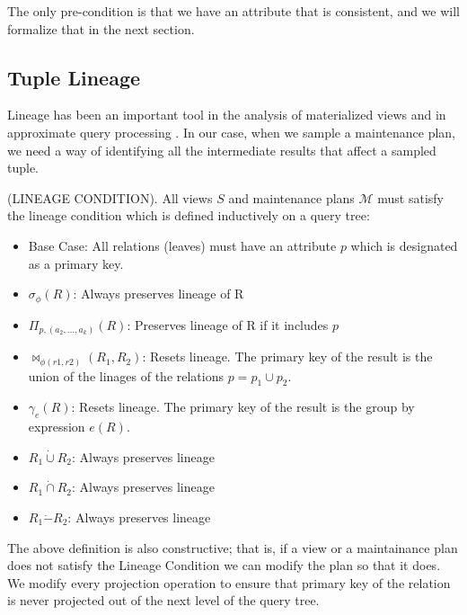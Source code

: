 The only pre-condition is that we have an attribute that is consistent, and we will formalize that in the next section.

\subsection{Tuple Lineage}
Lineage has been an important tool in the analysis of materialized views \cite{DBLP:journals/vldb/CuiW03} and in approximate query processing \cite{DBLP:conf/sigmod/ZengGMZ14}.
In our case, when we sample a maintenance plan, we need a way of identifying all the intermediate results that affect a sampled tuple.

\begin{definition}
(LINEAGE CONDITION). All views $S$ and maintenance plans $\mathcal{M}$ must satisfy the lineage condition which is defined inductively on a query tree:
\begin{itemize}\vspace{-.45em}
\item Base Case: All relations (leaves) must have an attribute $p$ which is designated as a primary key.\vspace{-.45em}
\item $\sigma_{\phi}(R)$: Always preserves lineage of R \vspace{-.45em}
\item $\Pi_{p,(a_2,...,a_k)}(R)$: Preserves lineage of R if it includes $p$ \vspace{-.45em}
\item $\bowtie_{\phi (r1,r2)}(R_1,R_2)$: Resets lineage. The primary key of the result is the union of the linages of the relations $p= p_1 \cup p_2$.
\item $\gamma_{e}(R)$: Resets lineage. The primary key of the result is the group by expression $e(R)$.\vspace{-.45em}
\item $R_1 \dot{\cup} R_2$: Always preserves lineage
\item $R_1 \dot{\cap} R_2$: Always preserves lineage 
\item $R_1 \dot{-} R_2$: Always preserves lineage 
\end{itemize}
\end{definition}

The above definition is also constructive; that is, if a view or a maintainance plan does not satisfy the Lineage Condition we can modify the plan so that it does.
We modify every projection operation to ensure that primary key of the relation is never projected out of the next level of the query tree.


